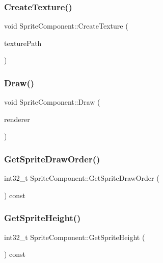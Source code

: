 \subsubsection{\texorpdfstring{Create\+Texture()}{CreateTexture()}}
{\footnotesize\ttfamily void Sprite\+Component\+::\+Create\+Texture (\begin{DoxyParamCaption}\item[{const std\+::string \&}]{texture\+Path }\end{DoxyParamCaption})}

\mbox{\label{class_sprite_component_ac696d85039713b2afbf4db0b361177b1}} 
\subsubsection{\texorpdfstring{Draw()}{Draw()}}
{\footnotesize\ttfamily void Sprite\+Component\+::\+Draw (\begin{DoxyParamCaption}\item[{S\+D\+L\+\_\+\+Renderer $\ast$}]{renderer }\end{DoxyParamCaption})}

\mbox{\label{class_sprite_component_aab677bb3904863fafcfaa4cb4790dd2a}} 
\subsubsection{\texorpdfstring{Get\+Sprite\+Draw\+Order()}{GetSpriteDrawOrder()}}
{\footnotesize\ttfamily int32\+\_\+t Sprite\+Component\+::\+Get\+Sprite\+Draw\+Order (\begin{DoxyParamCaption}{ }\end{DoxyParamCaption}) const\hspace{0.3cm}{\ttfamily [inline]}}

\mbox{\label{class_sprite_component_a7a060e8695f35c136a78731b3d865f6e}} 
\subsubsection{\texorpdfstring{Get\+Sprite\+Height()}{GetSpriteHeight()}}
{\footnotesize\ttfamily int32\+\_\+t Sprite\+Component\+::\+Get\+Sprite\+Height (\begin{DoxyParamCaption}{ }\end{DoxyParamCaption}) const\hspace{0.3cm}{\ttfamily [inline]}}

